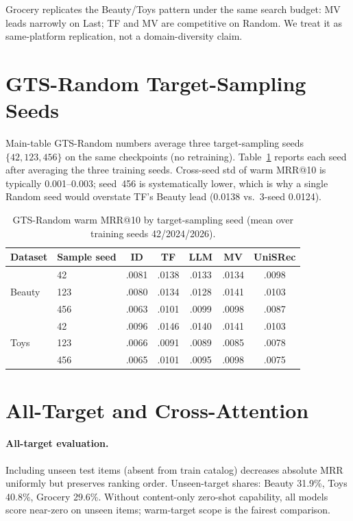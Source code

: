 \documentclass[sigconf,natbib=true,anonymous]{acmart}
\begin{document}
Grocery replicates the Beauty/Toys pattern under the same search budget: MV leads narrowly on Last; TF and MV are competitive on Random.
We treat it as same-platform replication, not a domain-diversity claim.

\section{GTS-Random Target-Sampling Seeds}
\label{app:random-seeds}

Main-table GTS-Random numbers average three target-sampling seeds $\{42,123,456\}$ on the same checkpoints (no retraining).
Table~\ref{tab:random-seeds} reports each seed after averaging the three training seeds.
Cross-seed std of warm MRR@10 is typically 0.001--0.003; seed~456 is systematically lower, which is why a single Random seed would overstate TF's Beauty lead (0.0138 vs.\ 3-seed 0.0124).

\begin{table}[h]
\centering
\caption{GTS-Random warm MRR@10 by target-sampling seed (mean over training seeds 42/2024/2026).}
\label{tab:random-seeds}
\small
\setlength{\tabcolsep}{3pt}
\begin{tabular}{@{}llccccc@{}}
\toprule
Dataset & Sample seed & ID & TF & LLM & MV & UniSRec \\
\midrule
\multirow{3}{*}{Beauty}
 & 42    & .0081 & .0138 & .0133 & .0134 & .0098 \\
 & 123   & .0080 & .0134 & .0128 & .0141 & .0103 \\
 & 456   & .0063 & .0101 & .0099 & .0098 & .0087 \\
\midrule
\multirow{3}{*}{Toys}
 & 42    & .0096 & .0146 & .0140 & .0141 & .0103 \\
 & 123   & .0066 & .0091 & .0089 & .0085 & .0078 \\
 & 456   & .0065 & .0101 & .0095 & .0098 & .0075 \\
\bottomrule
\end{tabular}
\end{table}

\section{All-Target and Cross-Attention}
\label{app:alltarget}

\paragraph{All-target evaluation.}
Including unseen test items (absent from train catalog) decreases absolute MRR uniformly but preserves ranking order.
Unseen-target shares: Beauty 31.9\%, Toys 40.8\%, Grocery 29.6\%.
Without content-only zero-shot capability, all models score near-zero on unseen items; warm-target scope is the fairest comparison.
\end{document}
